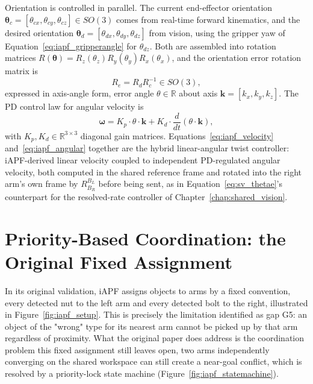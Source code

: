 Orientation is controlled in parallel. The current end-effector orientation
$\boldsymbol{\theta}_c = [\theta_{cx}, \theta_{cy}, \theta_{cz}] \in SO(3)$ comes from real-time
forward kinematics, and the desired orientation $\boldsymbol{\theta}_d = [\theta_{dx}, \theta_{dy}, \theta_{dz}]$
from vision, using the gripper yaw of Equation~\eqref{eq:iapf_gripperangle} for $\theta_{dz}$. Both
are assembled into rotation matrices $R(\boldsymbol{\theta}) = R_z(\theta_z) R_y(\theta_y) R_x(\theta_x)$,
and the orientation error rotation matrix is
\begin{equation}
R_e = R_d R_c^{-1} \in SO(3),
\label{eq:iapf_orierror}
\end{equation}
expressed in axis-angle form, error angle $\theta \in \mathbb{R}$ about axis
$\mathbf{k} = [k_x, k_y, k_z]$. The PD control law for angular velocity is
\begin{equation}
\boldsymbol{\omega} = K_p \cdot \theta \cdot \mathbf{k} + K_d \cdot \frac{d}{dt}(\theta \cdot \mathbf{k}),
\label{eq:iapf_angular}
\end{equation}
with $K_p, K_d \in \mathbb{R}^{3 \times 3}$ diagonal gain matrices. Equations~\eqref{eq:iapf_velocity}
and~\eqref{eq:iapf_angular} together are the hybrid linear-angular twist controller: iAPF-derived
linear velocity coupled to independent PD-regulated angular velocity, both computed in the shared
reference frame and rotated into the right arm's own frame by $R^{B_L}_{B_R}$ before being sent, as
in Equation~\eqref{eq:sv_thetae}'s counterpart for the resolved-rate controller of
Chapter~\ref{chap:shared_vision}.

\section{Priority-Based Coordination: the Original Fixed Assignment}\label{sec:iapf_priority}

In its original validation, iAPF assigns objects to arms by a fixed convention, every detected nut
to the left arm and every detected bolt to the right, illustrated in
Figure~\ref{fig:iapf_setup}. This is precisely the limitation identified as gap G5: an object of the
"wrong" type for its nearest arm cannot be picked up by that arm regardless of proximity. What the
original paper does address is the coordination problem this fixed assignment still leaves open, two
arms independently converging on the shared workspace can still create a near-goal conflict, which
is resolved by a priority-lock state machine (Figure~\ref{fig:iapf_statemachine}).

